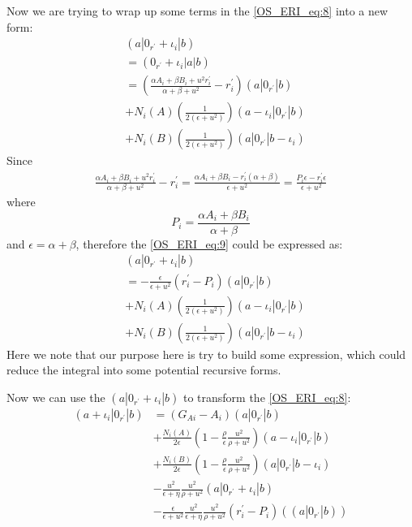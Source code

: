 Now we are trying to wrap up some terms in the \ref{OS_ERI_eq:8} into a new
form:
\begin{equation}
 \begin{split}
  &(a|0_{r^{'}}+\iota_{i}|b) \\
  & =(0_{r^{'}}+\iota_{i}|a|b)  \\
  &= \left( \frac{\alpha A_{i} + \beta B_{i} + u^{2}r^{'}_{i}}
{\alpha +\beta + u^{2}} - r^{'}_{i}\right)(a|0_{r^{'}}|b)\\
&+
N_{i}(A)\left(\frac{1}{2(\epsilon+u^{2})}\right)(a-\iota_{i}|0_{r^{'}}|b) \\
&+
N_{i}(B)\left(\frac{1}{2(\epsilon+u^{2})}\right)(a|0_{r^{'}}|b-\iota_{i})
 \end{split}
\label{OS_ERI_eq:9}
\end{equation}
Since
\begin{equation}
 \begin{split}
  \frac{\alpha A_{i} + \beta B_{i} + u^{2}r^{'}_{i}}
{\alpha +\beta + u^{2}} - r^{'}_{i} = 
 \frac{\alpha A_{i} + \beta B_{i} -r^{'}_{i}(\alpha+\beta)}
{\epsilon + u^{2}} = \frac{P_{i}\epsilon -r^{'}_{i}\epsilon}
{\epsilon + u^{2}}
 \end{split}
\end{equation}
where 
\begin{equation}
 P_{i} = \frac{\alpha A_{i} + \beta B_{i}}{\alpha+\beta}
\end{equation}
and $\epsilon = \alpha+\beta$, therefore the \ref{OS_ERI_eq:9} could be
expressed as:
\begin{equation}
 \begin{split}
&(a|0_{r^{'}}+\iota_{i}|b) \\
&=-\frac{\epsilon}{\epsilon + u^{2}}(r^{'}_{i} - P_{i})(a|0_{r^{'}}|b) \\
&+
N_{i}(A)\left(\frac{1}{2(\epsilon+u^{2})}\right)(a-\iota_{i}|0_{r^{'}}|b) \\
&+
N_{i}(B)\left(\frac{1}{2(\epsilon+u^{2})}\right)(a|0_{r^{'}}|b-\iota_{i})  
 \end{split}
\label{OS_ERI_eq:10}
\end{equation}
Here we note that our purpose here is try to build some expression, which
could reduce the integral into some potential recursive forms.

Now we can use the $(a|0_{r^{'}}+\iota_{i}|b)$ to transform the
\ref{OS_ERI_eq:8}:
\begin{equation}
 \begin{split}
    (a+\iota_{i}|0_{r^{'}}|b)
&=(G_{Ai} - A_{i})(a|0_{r^{'}}|b) \\
&+
\frac{N_{i}(A)}{2\epsilon}\left(1-\frac{\rho}{\epsilon}
\frac{u^{2}}{\rho+u^{2}}\right)(a-\iota_{i}|0_{r^{'}}|b) \\
&+ \frac{N_{i}(B)}{2\epsilon}\left(1-\frac{\rho}{\epsilon}
\frac{u^{2}}{\rho+u^{2}}\right)(a|0_{r^{'}}|b-\iota_{i}) \\
&-\frac{u^{2}}{\epsilon+\eta}\frac{u^{2}}{\rho+u^{2}}(a|0_{r^{'}}+\iota_{i}|b) \\
&-\frac{\epsilon}{\epsilon+u^{2}}
\frac{u^{2}}{\epsilon+\eta}\frac{u^{2}}{\rho+u^{2}}(r^{'}_{i} - P_{i})((a|0_{r^{'}}|b)) 
 \end{split}
\label{OS_ERI_eq:11}
\end{equation}

